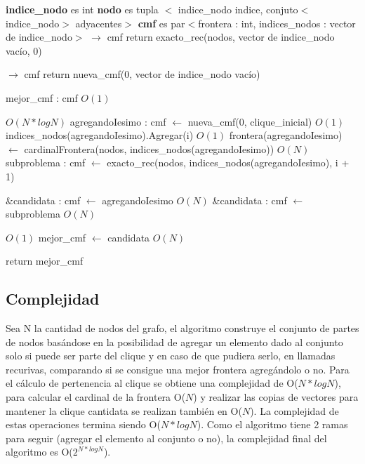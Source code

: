 \documentclass[a4paper, 10pt, twoside]{article}
\newenvironment{pseudo}[1][]{%
    \vspace{1em}%
    \begin{algorithmic}%
}
{%
    \end{algorithmic}%
    \vspace{1em}%
}
\newcommand{\Ode}[1]{\hfill $O(#1)$}
\begin{document}
\begin{pseudo}
\State \textbf{indice\_nodo} es int
\State \textbf{nodo} es tupla $<$ indice\_nodo indice, conjuto$<$indice\_nodo$>$ adyacentes$>$
\State \textbf{cmf} es par$<$frontera : int, indices\_nodos : vector de indice\_nodo$>$
\State
{} $\rightarrow$ cmf
	\State return exacto\_rec(nodos, vector de indice\_nodo vacío, 0)
\State
\EndProcedure

 $\rightarrow$ cmf
	 return nueva\_cmf(0, vector de indice\_nodo vacío) \EndIf

	\State mejor\_cmf : cmf									\Ode{1}

		 \Ode{N * log N}
			\State agregandoIesimo : cmf $\leftarrow$ nueva\_cmf(0, clique\_inicial)	\Ode{1}
			\State indices\_nodos(agregandoIesimo).Agregar(i)	\Ode{1}
			\State frontera(agregandoIesimo) $\leftarrow$
					cardinalFrontera(nodos, indices\_nodos(agregandoIesimo))	\Ode{N}
			\State subproblema : cmf $\leftarrow$
					exacto\_rec(nodos, indices\_nodos(agregandoIesimo), i + 1)

				\State \&candidata : cmf $\leftarrow$ agregandoIesimo			\Ode{N}
			\Else 
				\State \&candidata : cmf $\leftarrow$ subproblema				\Ode{N}
			\EndIf

			 \Ode{1}
				\State mejor\_cmf $\leftarrow$ candidata	\Ode{N}
			\EndIf
		\EndIf
	\EndFor

	\State return mejor\_cmf
\EndProcedure
\end{pseudo}

\subsection{Complejidad}
Sea N la cantidad de nodos del grafo, el algoritmo construye el conjunto de partes de nodos basándose en la posibilidad de agregar un elemento dado al conjunto solo si puede ser parte del clique y en caso de que pudiera serlo, en llamadas recurivas, comparando si se consigue una mejor frontera agregándolo o no. Para el cálculo de pertenencia al clique se obtiene una complejidad de O($N * log N$), para calcular el cardinal de la frontera O($N$) y realizar las copias de vectores para mantener la clique cantidata se realizan también en O($N$). La complejidad de estas operaciones termina siendo O($N * log N$). Como el algoritmo tiene 2 ramas para seguir (agregar el elemento al conjunto o no), la complejidad final del algoritmo es O($2^{N * log N}$).
\end{document}
